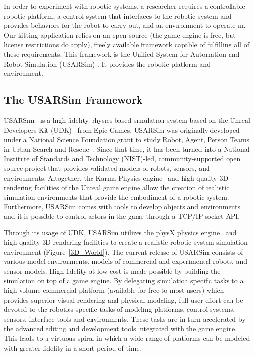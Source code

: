 \label{sect:simulation}
In order to experiment with robotic systems, a researcher requires a controllable robotic platform, a control system that interfaces to the robotic system and provides behaviors for the robot to carry out, and an environment to operate in. Our kitting application relies on an open source (the game engine is free, but license restrictions do apply), freely available framework capable of fulfilling all of these requirements. This framework is the Unified System for Automation and Robot Simulation (USARSim) \cite{USARSimWeb}. It provides the robotic platform and environment.

\subsection{The USARSim Framework}

USARSim~\cite{CARPIN.LNAI.2006,WANG.WSC.2003} is a high-fidelity physics-based simulation system based on the Unreal Developers Kit (UDK)~\cite{UDKWeb} from Epic Games. USARSim was originally developed under a National Science Foundation grant to study Robot, Agent, Person Teams in Urban Search and Rescue~\cite{LEWIS.ICHC.2003}. Since that time, it has been turned into a National Institute of Standards and Technology (NIST)-led, community-supported open source project that provides validated models of robots, sensors, and environments. Altogether, the Karma Physics engine~\cite{KarmEngine} and high-quality 3D rendering facilities of the Unreal game engine allow the creation of realistic simulation environments that provide the embodiment of a robotic system. Furthermore, USARSim comes with tools to develop objects and environments and it is possible to control actors in the game through a TCP/IP socket API.

Through its usage of UDK, USARSim utilizes the physX physics engine~\cite{physXWeb} and high-quality 3D rendering facilities to create a realistic robotic system simulation environment (Figure~\ref{3D_World}). The current release of USARSim consists of various model environments, models of commercial and experimental robots, and sensor models. High fidelity at low cost is made possible by building the simulation on top of a game engine. By delegating  simulation specific tasks to a high volume commercial platform (available for free to most users) which provides superior visual rendering and physical modeling, full user effort can be devoted to the robotics-specific tasks of modeling platforms, control systems, sensors, interface tools and environments. These tasks are in turn accelerated by the advanced editing and development tools integrated with the game engine. This leads to a virtuous spiral in which a wide range of platforms can be modeled with greater fidelity in a short period of time.


